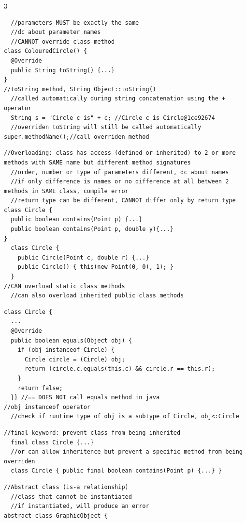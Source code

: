 \documentclass[10pt]{article}
\begin{document}
\begin{multicols*}{3}
\begin{verbatim}
  //parameters MUST be exactly the same
  //dc about parameter names
  //CANNOT override class method
class ColouredCircle() {
  @Override
  public String toString() {...}
}
//toString method, String Object::toString()
  //called automatically during string concatenation using the + operator
  String s = "Circle c is" + c; //Circle c is Circle@1ce92674
  //overriden toString will still be called automatically
super.methodName();//call overriden method
\end{verbatim}
\begin{verbatim}
//Overloading: class has access (defined or inherited) to 2 or more methods with SAME name but different method signatures
  //order, number or type of parameters different, dc about names
  //if only difference is names or no difference at all between 2 methods in SAME class, compile error
  //return type can be different, CANNOT differ only by return type
class Circle {
  public boolean contains(Point p) {...}
  public boolean contains(Point p, double y){...}
}
  class Circle {
    public Circle(Point c, double r) {...}
    public Circle() { this(new Point(0, 0), 1); }
  }
//CAN overload static class methods
  //can also overload inherited public class methods
\end{verbatim}
\begin{verbatim}
class Circle {
  ...
  @Override
  public boolean equals(Object obj) {
    if (obj instanceof Circle) {
      Circle circle = (Circle) obj;
      return (circle.c.equals(this.c) && circle.r == this.r);
    }
    return false;
  }} //== DOES NOT call equals method in java
//obj instanceof operator
  //check if runtime type of obj is a subtype of Circle, obj<:Circle
\end{verbatim}
\begin{verbatim}
//final keyword: prevent class from being inherited
  final class Circle {...}
  //or can allow inheritence but prevent a specific method from being overriden
  class Circle { public final boolean contains(Point p) {...} }
\end{verbatim}
\begin{verbatim}
//Abstract class (is-a relationship)
  //class that cannot be instantiated
  //if instantiated, will produce an error
abstract class GraphicObject {

\end{verbatim}
\end{multicols*}
\end{document}
